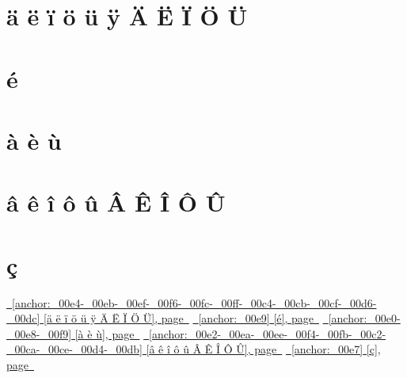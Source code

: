 \documentclass{book}
\newcommand{\Texinfothechapterheading}{}
\newcommand{\Texinfoheadingchaptername}{\chaptername}
\newcommand{\Texinfochapter}[1]{\chapter{#1}
\renewcommand{\Texinfothechapterheading}{\Texinfoheadingchaptername{} \thechapter{} }%
}%
\renewcommand{\_}{\Texinfounderscore\discretionary{}{}{}}
\begin{document}
\label{anchor:Top}%
\Texinfochapter{{ä ë ï ö ü ÿ Ä Ë Ï Ö Ü}}
\label{anchor:_00e4-_00eb-_00ef-_00f6-_00fc-_00ff-_00c4-_00cb-_00cf-_00d6-_00dc}%

\Texinfochapter{{é}}
\label{anchor:_00e9}%

\Texinfochapter{{à è ù}}
\label{anchor:_00e0-_00e8-_00f9}%

\Texinfochapter{{â ê î ô û Â Ê Î Ô Û}}
\label{anchor:_00e2-_00ea-_00ee-_00f4-_00fb-_00c2-_00ca-_00ce-_00d4-_00db}%

\Texinfochapter{{ç}}
\label{anchor:_00e7}%

\hyperref[anchor:_00e4-_00eb-_00ef-_00f6-_00fc-_00ff-_00c4-_00cb-_00cf-_00d6-_00dc]{\chaptername~\ref*{anchor:_00e4-_00eb-_00ef-_00f6-_00fc-_00ff-_00c4-_00cb-_00cf-_00d6-_00dc} [ä ë ï ö ü ÿ Ä Ë Ï Ö Ü], page~\pageref*{anchor:_00e4-_00eb-_00ef-_00f6-_00fc-_00ff-_00c4-_00cb-_00cf-_00d6-_00dc}}
\hyperref[anchor:_00e9]{\chaptername~\ref*{anchor:_00e9} [é], page~\pageref*{anchor:_00e9}}
\hyperref[anchor:_00e0-_00e8-_00f9]{\chaptername~\ref*{anchor:_00e0-_00e8-_00f9} [à è ù], page~\pageref*{anchor:_00e0-_00e8-_00f9}}
\hyperref[anchor:_00e2-_00ea-_00ee-_00f4-_00fb-_00c2-_00ca-_00ce-_00d4-_00db]{\chaptername~\ref*{anchor:_00e2-_00ea-_00ee-_00f4-_00fb-_00c2-_00ca-_00ce-_00d4-_00db} [â ê î ô û Â Ê Î Ô Û], page~\pageref*{anchor:_00e2-_00ea-_00ee-_00f4-_00fb-_00c2-_00ca-_00ce-_00d4-_00db}}
\hyperref[anchor:_00e7]{\chaptername~\ref*{anchor:_00e7} [ç], page~\pageref*{anchor:_00e7}}

%
%
%
%
%
%
\end{document}
